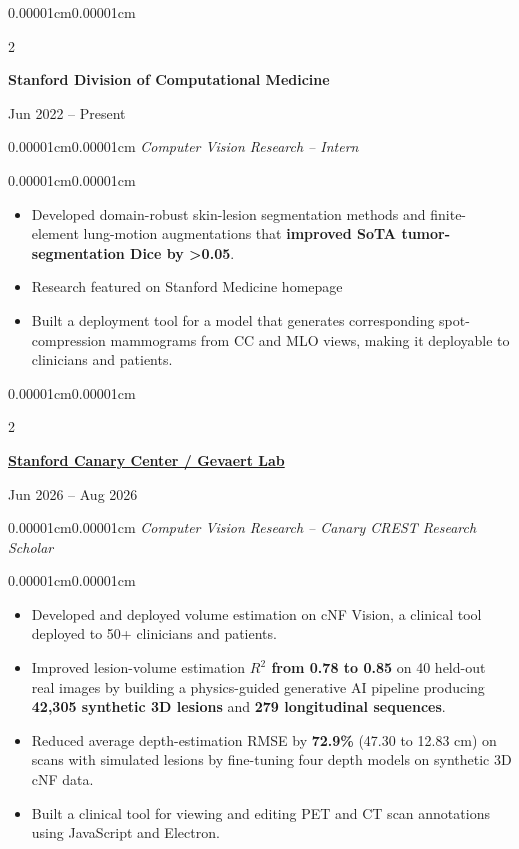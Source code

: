 \documentclass[10pt, letterpaper]{article}
\newenvironment{highlights}[1][18pt]{
  \begin{itemize}[topsep=0.04cm, parsep=0.02cm, partopsep=0pt, itemsep=0pt, leftmargin=#1]
}{
  \end{itemize}
}
\newenvironment{onecolentry}{
  \begin{adjustwidth}{0.00001cm}{0.00001cm}
}{
  \end{adjustwidth}
}
\newenvironment{twocolentry}[2][]{
  \onecolentry
  \def\secondColumn{#2}
  \setcolumnwidth{\fill,4.5cm}
  \begin{paracol}{2}
}{
  \switchcolumn \raggedleft \secondColumn
  \end{paracol}
  \endonecolentry
}
\newcommand{\experiencecompany}[1]{{\fontsize{10.5pt}{11.5pt}\selectfont\textbf{#1}}}
\newcommand{\experiencefocus}[1]{\begin{onecolentry}\small\textit{#1}\end{onecolentry}}
\begin{document}
\begin{twocolentry}{Jun 2022 -- Present}
    \experiencecompany{Stanford Division of Computational Medicine}
  \end{twocolentry}
  \experiencefocus{Computer Vision Research -- Intern}
  \begin{onecolentry}
    \begin{highlights}
      \item Developed domain-robust skin-lesion segmentation methods and finite-element lung-motion augmentations that \textbf{improved SoTA tumor-segmentation Dice by >0.05}.
      \item Research featured on Stanford Medicine homepage
      \item Built a deployment tool for a model that generates corresponding spot-compression mammograms from CC and MLO views, making it deployable to clinicians and patients.
    \end{highlights}
  \end{onecolentry}

\begin{twocolentry}{Jun 2026 -- Aug 2026}
    \experiencecompany{\href{https://med.stanford.edu/canarycenter/canarycrest.html}{Stanford Canary Center / Gevaert Lab}}
  \end{twocolentry}
  \experiencefocus{Computer Vision Research -- Canary CREST Research Scholar}
  \begin{onecolentry}
    \begin{highlights}
      \item Developed and deployed volume estimation on cNF Vision, a clinical tool deployed to 50+ clinicians and patients.
      \item Improved lesion-volume estimation \textbf{$R^2$ from 0.78 to 0.85} on 40 held-out real images by building a physics-guided generative AI pipeline producing \textbf{42,305 synthetic 3D lesions} and \textbf{279 longitudinal sequences}.
      \item Reduced average depth-estimation RMSE by \textbf{72.9\%} (47.30 to 12.83 cm) on scans with simulated lesions by fine-tuning four depth models on synthetic 3D cNF data.
      \item Built a clinical tool for viewing and editing PET and CT scan annotations using JavaScript and Electron.
    \end{highlights}
  \end{onecolentry}
\end{document}
